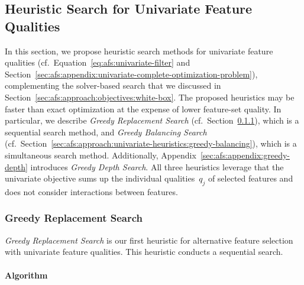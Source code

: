 \documentclass{article}
\theoremstyle{definition}
\begin{document}
\subsection{Heuristic Search for Univariate Feature Qualities}
\label{sec:afs:approach:univariate-heuristics}

In this section, we propose heuristic search methods for univariate feature qualities (cf.~Equation~\ref{eq:afs:univariate-filter} and Section~\ref{sec:afs:appendix:univariate-complete-optimization-problem}), complementing the solver-based search that we discussed in Section~\ref{sec:afs:approach:objectives:white-box}.
The proposed heuristics may be faster than exact optimization at the expense of lower feature-set quality.
In particular, we describe \emph{Greedy Replacement Search} (cf.~Section~\ref{sec:afs:approach:univariate-heuristics:greedy-replacement}), which is a sequential search method, and \emph{Greedy Balancing Search} (cf.~Section~\ref{sec:afs:approach:univariate-heuristics:greedy-balancing}), which is a simultaneous search method.
Additionally, Appendix~\ref{sec:afs:appendix:greedy-depth} introduces \emph{Greedy Depth Search}.
All three heuristics leverage that the univariate objective sums up the individual qualities~$q_j$ of selected features and does not consider interactions between features.

\subsubsection{Greedy Replacement Search}
\label{sec:afs:approach:univariate-heuristics:greedy-replacement}

\emph{Greedy Replacement Search} is our first heuristic for alternative feature selection with univariate feature qualities.
This heuristic conducts a sequential search.

\paragraph{Algorithm}
\end{document}
